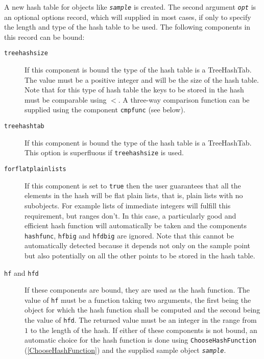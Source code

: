 \documentclass[a4paper,11pt]{report}
\begin{document}
{{{ A new hash table for objects like \mbox{\texttt{\mdseries\slshape sample}} is created. The second argument \mbox{\texttt{\mdseries\slshape opt}} is an optional options record, which will supplied in most cases, if only to
specify the length and type of the hash table to be used. The following
components in this record can be bound: 
\begin{description}
\item[{\texttt{treehashsize}}]  If this component is bound the type of the hash table is a TreeHashTab. The
value must be a positive integer and will be the size of the hash table. Note
that for this type of hash table the keys to be stored in the hash must be
comparable using $<$. A three-way comparison function can be supplied using the component \texttt{cmpfunc} (see below). 
\item[{\texttt{treehashtab}}]  If this component is bound the type of the hash table is a TreeHashTab. This
option is superfluous if \texttt{treehashsize} is used. 
\item[{\texttt{forflatplainlists}}]  If this component is set to \texttt{true} then the user guarantees that all the elements in the hash will be flat plain
lists, that is, plain lists with no subobjects. For example lists of immediate
integers will fulfill this requirement, but ranges don't. In this case, a
particularly good and efficient hash function will automatically be taken and
the components \texttt{hashfunc}, \texttt{hfbig} and \texttt{hfdbig} are ignored. Note that this cannot be automatically detected because it
depends not only on the sample point but also potentially on all the other
points to be stored in the hash table. 
\item[{\texttt{hf} and \texttt{hfd}}]  If these components are bound, they are used as the hash function. The value
of \texttt{hf} must be a function taking two arguments, the first being the object for which
the hash function shall be computed and the second being the value of \texttt{hfd}. The returned value must be an integer in the range from $1$ to the length of the hash. If either of these components is not bound, an
automatic choice for the hash function is done using \texttt{ChooseHashFunction} (\ref{ChooseHashFunction}) and the supplied sample object \mbox{\texttt{\mdseries\slshape sample}}. 


\end{description}}}}
\end{document}
